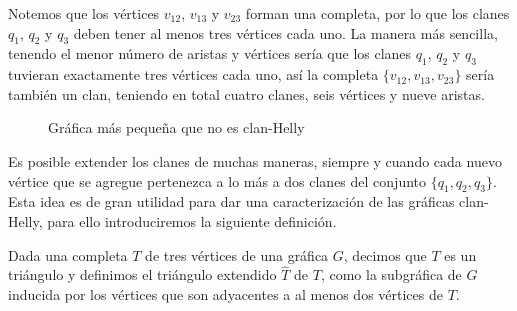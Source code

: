 \begin{center}
\end{center}
Notemos que los vértices $v_{12}$, $v_{13}$ y $v_{23}$ forman una completa, por lo que los clanes $q_1$, $q_2$ y $q_3$ deben tener al menos tres vértices cada uno. La manera más sencilla, tenendo el menor número de aristas y vértices sería que los clanes $q_1$, $q_2$ y $q_3$ tuvieran exactamente tres vértices cada uno, así la completa $\{v_{12}, v_{13}, v_{23}\}$ sería también un clan, teniendo en total cuatro clanes, seis vértices y nueve aristas.
\begin{figure}[H]\label{pequenh}
\centering
{}
\caption{Gráfica más pequeña que no es clan-Helly}
\end{figure}
Es posible extender los clanes de muchas maneras, siempre y cuando cada nuevo vértice que se agregue pertenezca a lo más a dos clanes del conjunto $\{q_1,q_2,q_3\}$.
Esta idea es de gran utilidad para dar una caracterización de las gráficas clan-Helly, para ello introduciremos la siguiente definición.
\begin{Defi}
Dada una completa $T$ de tres vértices de una gráfica $G$, decimos que $T$ es un triángulo y definimos el triángulo extendido $\hat{T}$ de $T$, como la subgráfica de $G$ inducida por los vértices que son adyacentes a al menos dos vértices de $T$.   
\end{Defi}

